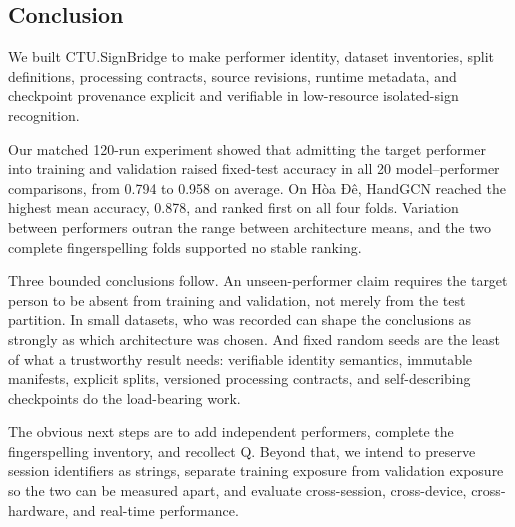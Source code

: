 \subsection{Conclusion}

We built CTU.SignBridge to make performer identity, dataset inventories, split definitions, processing contracts, source revisions, runtime metadata, and checkpoint provenance explicit and verifiable in low-resource isolated-sign recognition.

Our matched 120-run experiment showed that admitting the target performer into training and validation raised fixed-test accuracy in all 20 model--performer comparisons, from 0.794 to 0.958 on average. On Hòa Đê, HandGCN reached the highest mean accuracy, 0.878, and ranked first on all four folds. Variation between performers outran the range between architecture means, and the two complete fingerspelling folds supported no stable ranking.

Three bounded conclusions follow. An unseen-performer claim requires the target person to be absent from training and validation, not merely from the test partition. In small datasets, who was recorded can shape the conclusions as strongly as which architecture was chosen. And fixed random seeds are the least of what a trustworthy result needs: verifiable identity semantics, immutable manifests, explicit splits, versioned processing contracts, and self-describing checkpoints do the load-bearing work.

The obvious next steps are to add independent performers, complete the fingerspelling inventory, and recollect Q. Beyond that, we intend to preserve session identifiers as strings, separate training exposure from validation exposure so the two can be measured apart, and evaluate cross-session, cross-device, cross-hardware, and real-time performance.